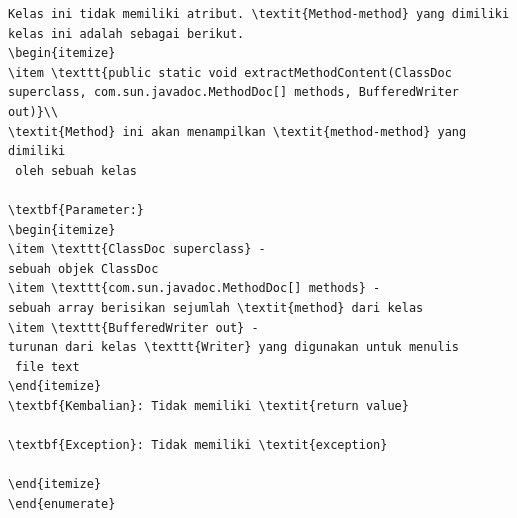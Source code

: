 \documentclass[a4paper,twoside]{article}
\begin{document}
\begin{enumerate}
\begin{lstlisting}[caption=Hasil Implementasi]
Kelas ini tidak memiliki atribut. \textit{Method-method} yang dimiliki kelas ini adalah sebagai berikut.
\begin{itemize}
\item \texttt{public static void extractMethodContent(ClassDoc superclass, com.sun.javadoc.MethodDoc[] methods, BufferedWriter out)}\\ 
\textit{Method} ini akan menampilkan \textit{method-method} yang dimiliki
 oleh sebuah kelas

\textbf{Parameter:}
\begin{itemize}
\item \texttt{ClassDoc superclass} - 
sebuah objek ClassDoc
\item \texttt{com.sun.javadoc.MethodDoc[] methods} - 
sebuah array berisikan sejumlah \textit{method} dari kelas
\item \texttt{BufferedWriter out} - 
turunan dari kelas \texttt{Writer} yang digunakan untuk menulis
 file text
\end{itemize}
\textbf{Kembalian}: Tidak memiliki \textit{return value}

\textbf{Exception}: Tidak memiliki \textit{exception}

\end{itemize}
\end{enumerate}

\end{lstlisting}


\end{enumerate}
\end{document}
